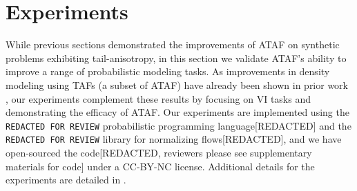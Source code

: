 \documentclass{article}
\theoremstyle{definition}
\theoremstyle{remark}
\begin{document}



\vspace{-2mm}
\section{Experiments}
\label{sec:experiments}

\vspace{-1mm}
While previous sections demonstrated the improvements of ATAF on synthetic problems
exhibiting tail-anisotropy, in this section we validate ATAF's ability to improve
a range of probabilistic modeling tasks. As improvements in density
modeling using TAFs (a subset of ATAF) have already been shown in prior work \citep{jaini2020tails},
our experiments complement these results by focusing on VI tasks and demonstrating the
efficacy of ATAF.
Our experiments are implemented using the 
\texttt{REDACTED FOR REVIEW} probabilistic programming language[REDACTED]
and the
\texttt{REDACTED FOR REVIEW} library for normalizing flows[REDACTED],
and we have open-sourced the code[REDACTED, reviewers please see supplementary materials for code]
under a CC-BY-NC license. Additional details for the experiments are detailed in .
\end{document}
